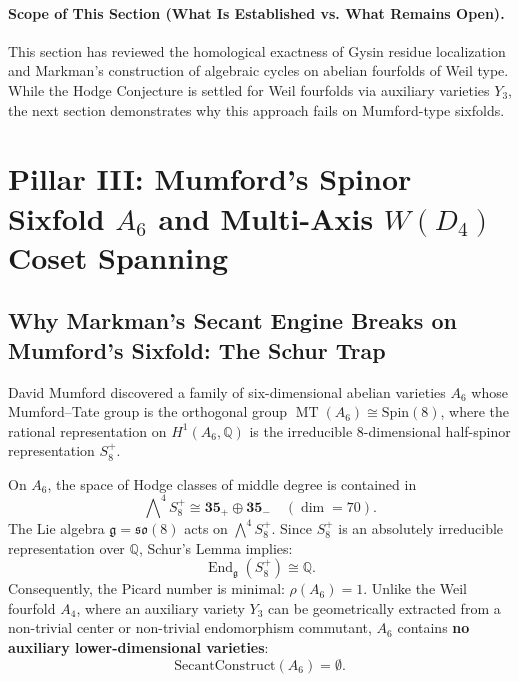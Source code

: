 \documentclass[11pt,a4paper]{article}
\theoremstyle{definition}
\theoremstyle{remark}
\DeclareMathOperator{\End}{End}
\DeclareMathOperator{\MT}{MT}
\begin{document}
\paragraph{Scope of This Section (What Is Established vs. What Remains Open).}
This section has reviewed the homological exactness of Gysin residue localization and Markman's construction of algebraic cycles on abelian fourfolds of Weil type. While the Hodge Conjecture is settled for Weil fourfolds via auxiliary varieties $Y_3$, the next section demonstrates why this approach fails on Mumford-type sixfolds.

\section{Pillar III: Mumford's Spinor Sixfold $A_6$ and Multi-Axis $W(D_4)$ Coset Spanning}
\label{sec:pillar_3}

\subsection{Why Markman's Secant Engine Breaks on Mumford's Sixfold: The Schur Trap}
David Mumford \cite{Mumford1969} discovered a family of six-dimensional abelian varieties $A_6$ whose Mumford--Tate group is the orthogonal group $\MT(A_6) \cong \mathrm{Spin}(8)$, where the rational representation on $H^1(A_6, \mathbb{Q})$ is the irreducible 8-dimensional half-spinor representation $S^+_8$.

On $A_6$, the space of Hodge classes of middle degree is contained in
\begin{equation}
\bigwedge\nolimits^{\!4} S^+_8 \cong \mathbf{35}_+ \oplus \mathbf{35}_- \quad (\dim = 70).
\end{equation}
The Lie algebra $\mathfrak{g} = \mathfrak{so}(8)$ acts on $\bigwedge^4 S^+_8$. Since $S^+_8$ is an absolutely irreducible representation over $\mathbb{Q}$, Schur's Lemma implies:
\begin{equation}
\End_{\mathfrak{g}}(S^+_8) \cong \mathbb{Q}.
\end{equation}
Consequently, the Picard number is minimal: $\rho(A_6) = 1$. Unlike the Weil fourfold $A_4$, where an auxiliary variety $Y_3$ can be geometrically extracted from a non-trivial center or non-trivial endomorphism commutant, $A_6$ contains \textbf{no auxiliary lower-dimensional varieties}:
\begin{equation}
\mathrm{SecantConstruct}(A_6) = \emptyset.
\end{equation}
\end{document}
